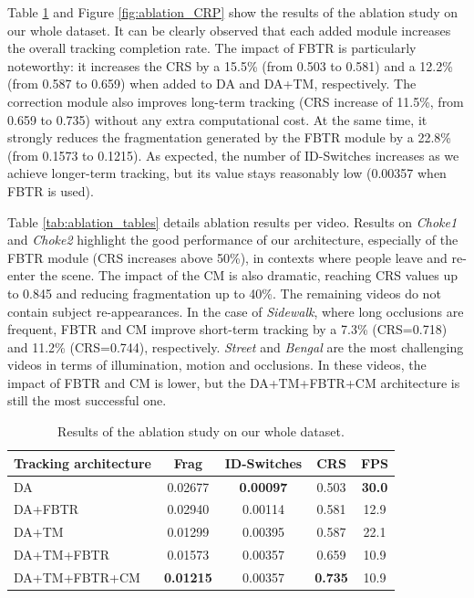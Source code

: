 Table \ref{tab:ablation_ALL_table} and Figure \ref{fig:ablation_CRP} show the results of the ablation study on our whole dataset. It can be clearly observed that each added module increases the overall tracking completion rate. The impact of FBTR is particularly noteworthy: it increases the CRS by a 15.5\% (from 0.503 to 0.581) and a 12.2\% (from 0.587 to 0.659) when added to DA and DA+TM, respectively.
The correction module also improves long-term tracking (CRS increase of 11.5\%, from 0.659 to 0.735) without any extra computational cost. At the same time, it strongly reduces the fragmentation generated by the FBTR module by a 22.8\% (from 0.1573 to 0.1215). As expected, the number of ID-Switches increases as we achieve longer-term tracking, but its value stays reasonably low (0.00357 when FBTR is used).

Table \ref{tab:ablation_tables} details ablation results per video. 
Results on \textit{Choke1} and \textit{Choke2} highlight the good performance of our architecture, especially of the FBTR module (CRS increases above 50\%), in contexts where people leave and re-enter the scene. The impact of the CM is also dramatic, reaching CRS values up to 0.845 and reducing fragmentation up to 40\%.
The remaining videos do not contain subject re-appearances. In the case of  \textit{Sidewalk}, where long occlusions are frequent, FBTR and CM improve short-term tracking by a 7.3\% (CRS=0.718) and  11.2\% (CRS=0.744), respectively.
\textit{Street} and \textit{Bengal} are the most challenging videos in terms of illumination, motion and occlusions. In these videos, the impact of FBTR and CM is lower, but the DA+TM+FBTR+CM architecture is still the most successful one.


\begin{table}[t]
    \centering
    \small
    \begin{tabular}{lcccc}
        \toprule
        Tracking architecture & Frag & ID-Switches & CRS & FPS\\
        \midrule
        DA & 0.02677 & \textbf{0.00097} & 0.503 & \textbf{30.0}\\
        DA+FBTR & 0.02940 & 0.00114 & 0.581 & 12.9\\
        DA+TM & 0.01299 & 0.00395 & 0.587 & 22.1\\
        DA+TM+FBTR & 0.01573 & 0.00357 & 0.659 & 10.9\\
        DA+TM+FBTR+CM & \textbf{0.01215} & 0.00357 & \textbf{0.735} & 10.9\\
        \bottomrule
    \end{tabular}
    \caption{Results of the ablation study on our whole dataset.}
    \label{tab:ablation_ALL_table}
\end{table}


